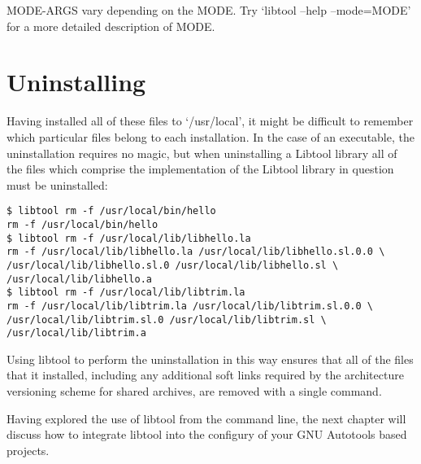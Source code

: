 MODE-ARGS vary depending on the MODE.  Try `libtool --help --mode=MODE'
for a more detailed description of MODE.

\section{Uninstalling}

Having installed all of these files to `/usr/local', it might be difficult to remember which particular files belong to each installation. In the case of an executable, the uninstallation requires no magic, but when uninstalling a Libtool library all of the files which comprise the implementation of the Libtool library in question must be uninstalled: 


\begin{verbatim}
$ libtool rm -f /usr/local/bin/hello
rm -f /usr/local/bin/hello
$ libtool rm -f /usr/local/lib/libhello.la
rm -f /usr/local/lib/libhello.la /usr/local/lib/libhello.sl.0.0 \
/usr/local/lib/libhello.sl.0 /usr/local/lib/libhello.sl \
/usr/local/lib/libhello.a
$ libtool rm -f /usr/local/lib/libtrim.la
rm -f /usr/local/lib/libtrim.la /usr/local/lib/libtrim.sl.0.0 \
/usr/local/lib/libtrim.sl.0 /usr/local/lib/libtrim.sl \
/usr/local/lib/libtrim.a
\end{verbatim} 

Using libtool to perform the uninstallation in this way ensures that all of the files that it installed, including any additional soft links required by the architecture versioning scheme for shared archives, are removed with a single command. 


Having explored the use of libtool from the command line, the next chapter will discuss how to integrate libtool into the configury of your GNU Autotools based projects.

